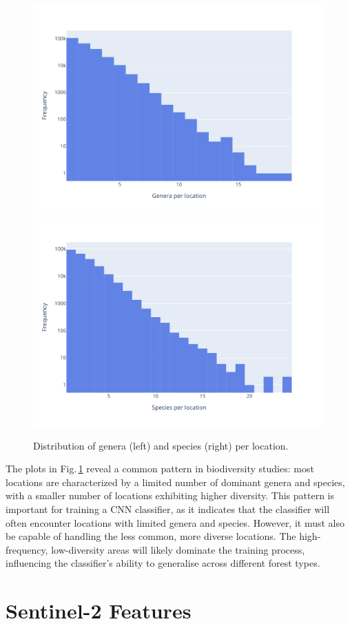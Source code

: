 \begin{figure}[!thb]
    \centering

    \includegraphics[width=0.48\linewidth, trim={0 0 2cm 0}]{figures/figures_labels/grouped_genus.pdf}%
    \includegraphics[width=0.48\linewidth, trim={0 0 2cm 0}]{figures/figures_labels/grouped_species.pdf}

    \caption{Distribution of genera (left) and species (right) per location.}
    \label{fig:grouped_histograms}
\end{figure}
 
The plots in Fig.\,\ref{fig:grouped_histograms} reveal a common pattern in biodiversity studies: most locations are characterized by a limited number of dominant genera and species, with a smaller number of locations exhibiting higher diversity. This pattern is important for training a CNN classifier, as it indicates that the classifier will often encounter locations with limited genera and species. However, it must also be capable of handling the less common, more diverse locations. The high-frequency, low-diversity areas will likely dominate the training process, influencing the classifier's ability to generalise across different forest types.

\section{Sentinel-2 Features}

